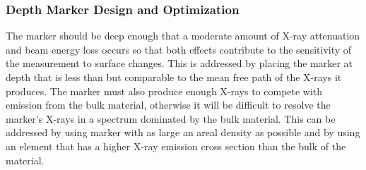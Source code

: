 \documentclass[12pt,letterpaper,final]{article}
\begin{document}
\subsubsection{Depth Marker Design and Optimization}

The marker should be deep enough that a moderate amount of X-ray attenuation and beam energy loss occurs so that both effects contribute to the sensitivity of the measurement to surface changes. This is addressed by placing the marker at depth that is less than but comparable to the mean free path of the X-rays it produces. The marker must also produce enough X-rays to compete with emission from the bulk material, otherwise it will be difficult to resolve the marker's X-rays in a spectrum dominated by the bulk material. This can be addressed by using marker with as large an areal density as possible and by using an element that has a higher X-ray emission cross section than the bulk of the material.








 
\end{document}
